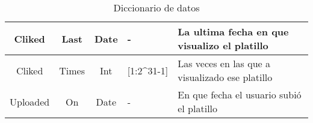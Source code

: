 \begin{landscape}
\begin{table}
\begin{center}
\begin{tabular}{| c | c | c | p{3cm} | p{12cm}|}
        \midrule
        Cliked & Last  & Date & -  & La ultima fecha en que visualizo el platillo \\
        \midrule
        Cliked & Times  & Int & [1:2^{31}-1]  & Las veces en las que a visualizado ese platillo \\
        \midrule
        Uploaded & On  & Date & - & En que fecha el usuario subió el platillo \\
        \bottomrule
      \end{tabular}
      \caption{Diccionario de datos}
      \label{Diccionario de datos}
    \end{center}
  \end{table}
\end{landscape}  
  